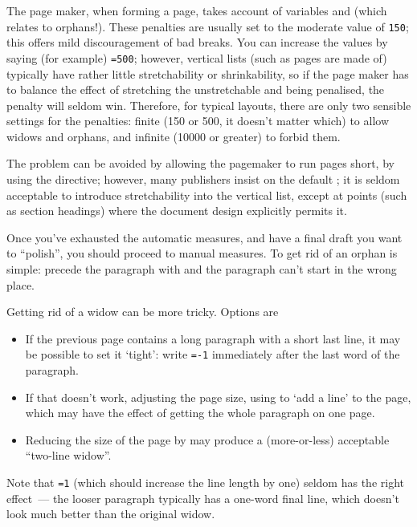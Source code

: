 The \AllTeX{} page maker, when forming a page, takes account of variables
 and  (which relates to orphans!).
These penalties are usually set to the moderate value of \texttt{150}; this
offers mild discouragement of bad breaks.  You can increase the values
by saying (for example) \texttt{=500}; however, vertical
lists (such as pages are made of) typically have rather little
stretchability or shrinkability, so if the page maker has to balance
the effect of stretching the unstretchable and being penalised, the
penalty will seldom win.  Therefore, for typical layouts, there are
only two sensible settings for the penalties: finite (150 or 500, it
doesn't matter which) to allow widows and orphans, and infinite (10000
or greater) to forbid them.

The problem can be avoided by allowing the pagemaker to run pages
short, by using the  directive; however, many
publishers insist on the default ; it is seldom
acceptable to introduce stretchability into the vertical list, except
at points (such as section headings) where the document design
explicitly permits it.

Once you've exhausted the automatic measures, and have a final draft
you want to ``polish'', you should proceed to manual measures.  To
get rid of an orphan is simple: precede the paragraph with
 and the paragraph can't start in the wrong place.

Getting rid of a widow can be more tricky.  Options are
\begin{itemize}
\item If the previous page contains a long paragraph with a short last
  line, it may be possible to set it `tight': write
  \texttt{=-1} immediately after the last word of the
  paragraph.
\item If that doesn't work, adjusting the page size, using
   to `add a line' to
  the page, which may have the effect of getting the whole paragraph
  on one page.
\item Reducing the size of the page by
   may produce a
  (more-or-less) acceptable ``two-line widow''.
\end{itemize}
Note that \texttt{=1} (which should increase the line
length by one) seldom has the right effect~--- the looser paragraph
typically has a one-word final line, which doesn't look much better
than the original widow.

